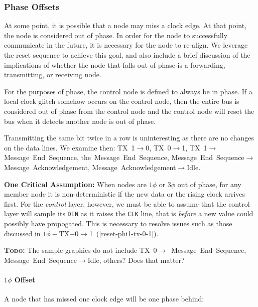 \subsubsection{Phase Offsets}
At some point, it is possible that a node may miss a clock edge. At that
point, the node is considered out of phase. In order for the node to
successfully communicate in the future, it is necessary for the node to
re-align. We leverage the reset sequence to achieve this goal, and also
include a brief discussion of the implications of whether the node that falls
out of phase is a forwarding, transmitting, or receiving node.

For the purposes of phase, the control node is defined to always be in phase.
If a local clock glitch somehow occurs on the control node, then the entire
bus is considered out of phase from the control node and the control node will
reset the bus when it detects another node is out of phase.

Transmitting the same bit twice in a row is uninteresting as there are no
changes on the data lines. We examine then: TX~1$\rightarrow$0,
TX~0$\rightarrow$1, TX~1$\rightarrow$Message~End~Sequence,
the~Message~End~Sequence,
Message~End~Sequence$\rightarrow$Message~Acknowledgement,
Message~Acknowledgement$\rightarrow$Idle.

\medskip
\noindent
\begin{framed}
  \label{reset-assumption}
  \textbf{One Critical Assumption:} When nodes are $1\phi$ or $3\phi$ out of
  phase, for any member node it is non-deterministic if the new data or the
  rising clock arrives first. For the {\em control} layer, however, we must
  be able to assume that the control layer will sample its {\tt DIN} as it
  raises the {\tt CLK} line, that is {\em before} a new value could possibly
  have propogated.  This is necessary to resolve issues such as those discussed
  in $1\phi-$TX$-0\rightarrow$1~(\ref{reset-phi1-tx-0-1}).
\end{framed}

\medskip
\textbf{\textsc{Todo:}} The sample graphics do not include
TX~0$\rightarrow$~Message~End~Sequence, Message~End~Sequence$\rightarrow$Idle,
others? Does that matter?

\paragraph{$1\phi$ Offset}
A node that has missed one clock edge will be one phase behind:

